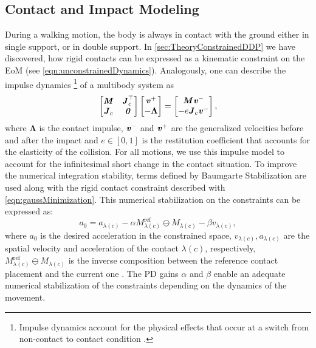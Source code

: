 \subsection{Contact and Impact Modeling}
During a walking motion, the body is always in contact with the ground either in single support, or in double support. In \cref{sec:TheoryConstrainedDDP} we have discovered, how rigid contacts can be expressed as a kinematic constraint on the \gls{EoM} (see \cref{eqn:unconstrainedDynamics}). 
Analogously, one can describe the impulse dynamics
\footnote{Impulse dynamics account for the physical effects that occur at a switch from non-contact to contact condition \cite{featherstone2014rigid}.} 
of a multibody system as
\begin{equation}\label{eqn:ImpulseDynamics}
\left[\begin{matrix}\bm{\mathit{M}} & \bm{\mathit{J}}^{\top}_c \\{\bm{\mathit{J}}_{c}} & \bm{\mathit{0}}\end{matrix}\right] \left[\begin{matrix} \bm{\mathit{v}}^+ \\ -\boldsymbol{\Lambda} \end{matrix}\right] = \left[\begin{matrix} \bm{\mathit{M}}\bm{\mathit{v}}^- \\ -e\bm{\mathit{J}}_c \bm{\mathit{v}}^-\end{matrix}\right],
\end{equation}
where $\boldsymbol{\Lambda}$ is the contact impulse, $\bm{\mathit{v}}^-$ and $\bm{\mathit{v}}^+$ are the generalized velocities before and after the impact and $e\in [0,1]$ is the restitution coefficient that accounts for the elasticity of the collision. For all motions, we use this impulse model to account for the infinitesimal short change in the contact situation. To improve the numerical integration stability, terms defined by Baumgarte Stabilization \cite{baumgarte1972stabilization} are used along with the rigid contact constraint described with \cref{eqn:gaussMinimization}. This numerical stabilization on the constraints can be expressed as:
\begin{equation}\label{eqn:BaumgarteStabilization}
a_0=a_{\lambda(c)}-\alpha M_{\lambda(c)}^{\text{ref}}\ominus M_{\lambda(c)}-\beta v_{\lambda(c)},
\end{equation}
where $a_0$ is the desired acceleration in the constrained space, $v_{\lambda(c)}, a_{\lambda(c)}$ are the spatial velocity and acceleration of the contact $\lambda(c)$, respectively, $M_{\lambda(c)}^{\text{ref}}\ominus M_{\lambda(c)}$ is the inverse composition between the reference contact placement and the current one \cite{mastalli20crocoddyl}. The PD gains $\alpha$ and $\beta$ enable an adequate numerical stabilization of the constraints depending on the dynamics of the movement.

